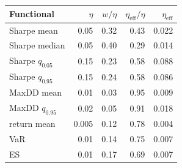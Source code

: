 \begin{tabular}{lrrrr}
\toprule
Functional & $\eta$ & $w/\eta$ & $\eta_{\mathrm{eff}}/\eta$ & $\eta_{\mathrm{eff}}$ \\
\midrule
Sharpe mean & 0.05 & 0.32 & 0.43 & 0.022 \\
Sharpe median & 0.05 & 0.40 & 0.29 & 0.014 \\
Sharpe $q_{0.05}$ & 0.15 & 0.23 & 0.58 & 0.088 \\
Sharpe $q_{0.95}$ & 0.15 & 0.24 & 0.58 & 0.086 \\
MaxDD mean & 0.01 & 0.03 & 0.95 & 0.009 \\
MaxDD $q_{0.95}$ & 0.02 & 0.05 & 0.91 & 0.018 \\
return mean & 0.005 & 0.12 & 0.78 & 0.004 \\
VaR & 0.01 & 0.14 & 0.75 & 0.007 \\
ES & 0.01 & 0.17 & 0.69 & 0.007 \\
\bottomrule
\end{tabular}
